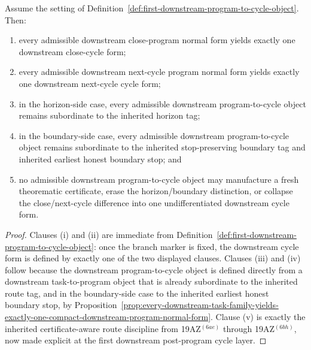 \begin{proposition}
\label{prop:every-downstream-program-normal-form-yields-exactly-one-controlled-downstream-cycle-form}
Assume the setting of Definition~\ref{def:first-downstream-program-to-cycle-object}. Then:
\begin{enumerate}[label=(\roman*)]
 \item every admissible downstream close-program normal form yields exactly one downstream close-cycle form;
 \item every admissible downstream next-cycle program normal form yields exactly one downstream next-cycle cycle form;
 \item in the horizon-side case, every admissible downstream program-to-cycle object remains subordinate to the inherited horizon tag;
 \item in the boundary-side case, every admissible downstream program-to-cycle object remains subordinate to the inherited stop-preserving boundary tag and inherited earliest honest boundary stop; and
 \item no admissible downstream program-to-cycle object may manufacture a fresh theorematic certificate, erase the horizon/boundary distinction, or collapse the close/next-cycle difference into one undifferentiated downstream cycle form.
\end{enumerate}
\end{proposition}

\begin{proof}
Clauses (i) and (ii) are immediate from Definition~\ref{def:first-downstream-program-to-cycle-object}: once the branch marker is fixed, the downstream cycle form is defined by exactly one of the two displayed clauses. Clauses (iii) and (iv) follow because the downstream program-to-cycle object is defined directly from a downstream task-to-program object that is already subordinate to the inherited route tag, and in the boundary-side case to the inherited earliest honest boundary stop, by Proposition~\ref{prop:every-downstream-task-family-yields-exactly-one-compact-downstream-program-normal-form}. Clause (v) is exactly the inherited certificate-aware route discipline from 19AZ$^{(6ae)}$ through 19AZ$^{(6bh)}$, now made explicit at the first downstream post-program cycle layer.
\end{proof}

